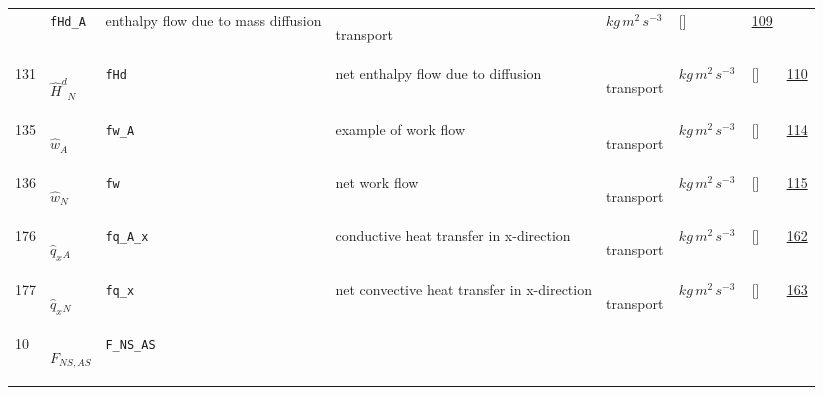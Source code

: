 \begin{longtable}{|p{1cm}|p{3cm}|p{3cm}|p{7cm}|p{3.0cm}|p{3cm}|p{2cm}|p{1cm}|}
             & \verb|fHd_A|
             & enthalpy flow due to mass diffusion
             & \begin{lay}transport \end{lay}
             & $ kg \,m^{2} \,s^{-3} \, $
             & []
             & \hyperlink{"e:109"}{ 109 }
                 \\
    131
             & \hypertarget{"v:131"}{ $ {\hat{H}^{d}}{_{N}} $}
             & \verb|fHd|
             & net enthalpy flow due to diffusion
             & \begin{lay}transport \end{lay}
             & $ kg \,m^{2} \,s^{-3} \, $
             & []
             & \hyperlink{"e:110"}{ 110 }
                 \\
    135
             & \hypertarget{"v:135"}{ $ {\hat{w}}{_{A}} $}
             & \verb|fw_A|
             & example of work flow
             & \begin{lay}transport \end{lay}
             & $ kg \,m^{2} \,s^{-3} \, $
             & []
             & \hyperlink{"e:114"}{ 114 }
                 \\
    136
             & \hypertarget{"v:136"}{ $ {\hat{w}}{_{N}} $}
             & \verb|fw|
             & net work flow
             & \begin{lay}transport \end{lay}
             & $ kg \,m^{2} \,s^{-3} \, $
             & []
             & \hyperlink{"e:115"}{ 115 }
                 \\
    176
             & \hypertarget{"v:176"}{ $ {\hat{q}_x}{_{A}} $}
             & \verb|fq_A_x|
             & conductive heat transfer in x-direction
             & \begin{lay}transport \end{lay}
             & $ kg \,m^{2} \,s^{-3} \, $
             & []
             & \hyperlink{"e:162"}{ 162 }
                 \\
    177
             & \hypertarget{"v:177"}{ $ {\hat{q}_x}{_{N}} $}
             & \verb|fq_x|
             & net convective heat transfer in x-direction
             & \begin{lay}transport \end{lay}
             & $ kg \,m^{2} \,s^{-3} \, $
             & []
             & \hyperlink{"e:163"}{ 163 }
                 \\
    10
             & \hypertarget{"v:10"}{ $ {F}{_{{N S}, {A S}}} $}
             & \verb|F_NS_AS|

\end{longtable}
